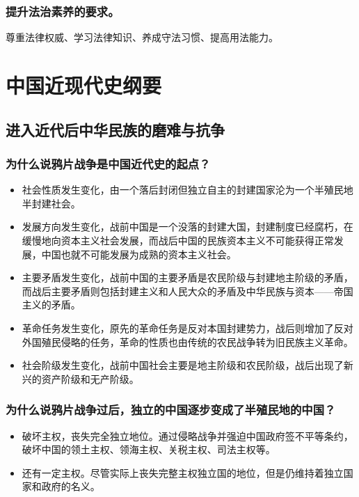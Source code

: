\documentclass{article}
\begin{document}
\subsubsection{提升法治素养的要求。}
尊重法律权威、学习法律知识、养成守法习惯、提高用法能力。

\newpage

\section{中国近现代史纲要}

\subsection{进入近代后中华民族的磨难与抗争}

\subsubsection{为什么说鸦片战争是中国近代史的起点？}
\begin{itemize}
    \item 社会性质发生变化，由一个落后封闭但独立自主的封建国家沦为一个半殖民地半封建社会。
    \item 发展方向发生变化，战前中国是一个没落的封建大国，封建制度已经腐朽，在缓慢地向资本主义社会发展，而战后中国的民族资本主义不可能获得正常发展，中国也就不可能发展为成熟的资本主义社会。
    \item 主要矛盾发生变化，战前中国的主要矛盾是农民阶级与封建地主阶级的矛盾，而战后主要矛盾则包括封建主义和人民大众的矛盾及中华民族与资本——帝国主义的矛盾。
    \item 革命任务发生变化，原先的革命任务是反对本国封建势力，战后则增加了反对外国殖民侵略的任务，革命的性质也由传统的农民战争转为旧民族主义革命。
    \item 社会阶级发生变化，战前中国社会主要是地主阶级和农民阶级，战后出现了新兴的资产阶级和无产阶级。
\end{itemize}

\subsubsection{为什么说鸦片战争过后，独立的中国逐步变成了半殖民地的中国？}
\begin{itemize}
    \item 破坏主权，丧失完全独立地位。通过侵略战争并强迫中国政府签不平等条约，破坏中国的领土主权、领海主权、关税主权、司法主权等。
    \item 还有一定主权。尽管实际上丧失完整主权独立国的地位，但是仍维持着独立国家和政府的名义。
\end{itemize}
\end{document}
